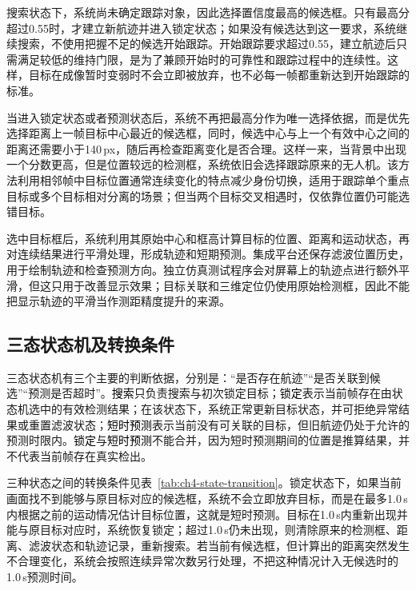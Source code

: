 搜索状态下，系统尚未确定跟踪对象，因此选择置信度最高的候选框。只有最高分超过0.55时，才建立新航迹并进入锁定状态；如果没有候选达到这一要求，系统继续搜索，不使用把握不足的候选开始跟踪。开始跟踪要求超过0.55，建立航迹后只需满足较低的维持门限，是为了兼顾开始时的可靠性和跟踪过程中的连续性。这样，目标在成像暂时变弱时不会立即被放弃，也不必每一帧都重新达到开始跟踪的标准。

当进入锁定状态或者预测状态后，系统不再把最高分作为唯一选择依据，而是优先选择距离上一帧目标中心最近的候选框，同时，候选中心与上一个有效中心之间的距离还需要小于140\,px，随后再检查距离变化是否合理。这样一来，当背景中出现一个分数更高，但是位置较远的检测框，系统依旧会选择跟踪原来的无人机。该方法利用相邻帧中目标位置通常连续变化的特点减少身份切换，适用于跟踪单个重点目标或多个目标相对分离的场景；但当两个目标交叉相遇时，仅依靠位置仍可能选错目标。

选中目标框后，系统利用其原始中心和框高计算目标的位置、距离和运动状态，再对连续结果进行平滑处理，形成轨迹和短期预测。集成平台还保存滤波位置历史，用于绘制轨迹和检查预测方向。独立仿真测试程序会对屏幕上的轨迹点进行额外平滑，但这只用于改善显示效果；目标关联和三维定位仍使用原始检测框，因此不能把显示轨迹的平滑当作测距精度提升的来源。

\subsection{三态状态机及转换条件}

三态状态机有三个主要的判断依据，分别是：“是否存在航迹”“是否关联到候选”“预测是否超时”。\textcolor{black}{搜索}只负责搜索与初次锁定目标；\textcolor{black}{锁定}表示当前帧存在由状态机选中的有效检测结果；在该状态下，系统正常更新目标状态，并可拒绝异常结果或重置滤波状态；\textcolor{black}{短时预测}表示当前没有可关联的目标，但旧航迹仍处于允许的预测时限内。\textcolor{black}{锁定}与\textcolor{black}{短时预测}不能合并，因为短时预测期间的位置是推算结果，并不代表当前帧存在真实检出。

三种状态之间的转换条件见表~\ref{tab:ch4-state-transition}。锁定状态下，如果当前画面找不到能够与原目标对应的候选框，系统不会立即放弃目标，而是在最多1.0\,s内根据之前的运动情况估计目标位置，这就是短时预测。目标在1.0\,s内重新出现并能与原目标对应时，系统恢复锁定；超过1.0\,s仍未出现，则清除原来的检测框、距离、滤波状态和轨迹记录，重新搜索。若当前有候选框，但计算出的距离突然发生不合理变化，系统会按照连续异常次数另行处理，不把这种情况计入无候选时的1.0\,s预测时间。

